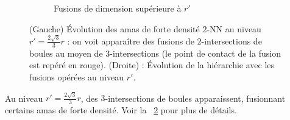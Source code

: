 \begin{figure}[htbp]
\begin{subfigure}[b]{0.53\textwidth}
        \caption{Fusions de dimension supérieure à $r'$}
        \label{fig:fusion_rprime}
    \end{subfigure}
    
    \caption{(Gauche) Évolution des amas de forte densité $2$-NN au niveau $r' = \frac{2\sqrt{3}}{3}r$ : on voit apparaître des fusions de $2$-intersections de boules au moyen de $3$-intersections (le point de contact de la fusion est repéré en rouge). (Droite) : Évolution de la hiérarchie avec les fusions opérées au niveau $r'$.}
    \label{fig:complexe_rprime_exact}
\end{figure}

Au niveau $r' = \frac{2\sqrt{3}}{3}r$, des $3$-intersections de boules apparaissent, fusionnant certains amas de forte densité. Voir la \Fig~\ref{fig:complexe_rprime_exact} pour plus de détails.



